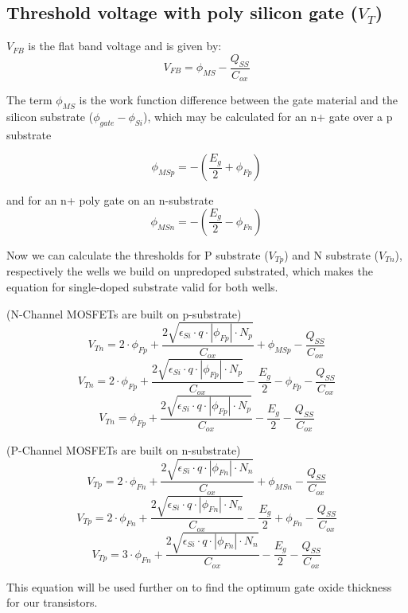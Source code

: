 \subsection{Threshold voltage with poly silicon gate ($V_T$)}
$V_{FB}$ is the flat band voltage and is given by:
\begin{equation}
V_{FB}
=
\phi_{MS} - \frac{Q_{SS}}{C_{ox}}
\end{equation}

The term $\phi_{MS}$ is the work function difference between the gate material and the silicon substrate ($\phi_{gate}-\phi_{Si}$), which may be calculated for an n+ gate over a p substrate

\begin{equation}
\phi_{MSp}
=
-(\frac{E_g}{2}+\phi_{Fp})
\end{equation}

and for an n+ poly gate on an n-substrate
\begin{equation}
\phi_{MSn}
=
-(\frac{E_g}{2}-\phi_{Fn})
\end{equation}

Now we can calculate the thresholds for P substrate ($V_{Tp}$) and N substrate  ($V_{Tn}$), respectively the wells we build on unpredoped substrated, which makes the equation for single-doped substrate valid for both wells.

(N-Channel MOSFETs are built on p-substrate)
\begin{equation}
V_{Tn} = 2 \cdot \phi_{Fp} + \frac{2 \sqrt{\epsilon_{Si}\cdot q \cdot \left| \phi_{Fp} \right| \cdot N_p}}{C_{ox}} + \phi_{MSp} - \frac{Q_{SS}}{C_{ox}}
\end{equation}
\begin{equation}
V_{Tn} = 2 \cdot \phi_{Fp} + \frac{2 \sqrt{\epsilon_{Si}\cdot q \cdot \left| \phi_{Fp} \right| \cdot N_p}}{C_{ox}} -\frac{E_g}{2} - \phi_{Fp} - \frac{Q_{SS}}{C_{ox}}
\end{equation}
\begin{equation}
V_{Tn} = \phi_{Fp} + \frac{2 \sqrt{\epsilon_{Si}\cdot q \cdot \left| \phi_{Fp} \right| \cdot N_p}}{C_{ox}} -\frac{E_g}{2} - \frac{Q_{SS}}{C_{ox}}
\end{equation}

(P-Channel MOSFETs are built on n-substrate)
\begin{equation}
V_{Tp} = 2 \cdot \phi_{Fn} + \frac{2 \sqrt{\epsilon_{Si}\cdot q \cdot \left| \phi_{Fn} \right| \cdot N_n}}{C_{ox}} + \phi_{MSn} - \frac{Q_{SS}}{C_{ox}}
\end{equation}
\begin{equation}
V_{Tp} = 2 \cdot \phi_{Fn} + \frac{2 \sqrt{\epsilon_{Si}\cdot q \cdot \left| \phi_{Fn} \right| \cdot N_n}}{C_{ox}} -\frac{E_g}{2} + \phi_{Fn} - \frac{Q_{SS}}{C_{ox}}
\end{equation}
\begin{equation}
V_{Tp} = 3 \cdot \phi_{Fn} + \frac{2 \sqrt{\epsilon_{Si}\cdot q \cdot \left| \phi_{Fn} \right| \cdot N_n}}{C_{ox}} -\frac{E_g}{2} - \frac{Q_{SS}}{C_{ox}}
\end{equation}

This equation will be used further on to find the optimum gate oxide thickness for our transistors.


